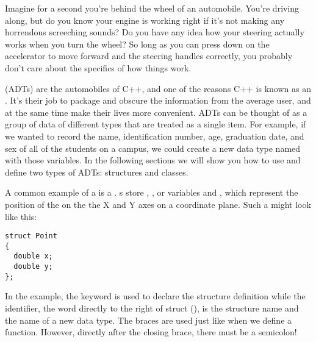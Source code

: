 

Imagine for a second you're behind the wheel of an automobile. 
You're driving along, but do you know your engine is working right if it's not making any horrendous screeching sounds? 
Do you have any idea how your steering actually works when you turn the wheel? 
So long as you can press down on the accelerator to move forward and the steering handles correctly, you probably don't care about the specifics of how things work.

 (ADTs) are the automobiles of C++, and one of the reasons C++ is known as an . 
It's their job to package and obscure the information from the average user, and at the same time make their lives more convenient.
ADTs can be thought of as a group of data of different types that are treated as a single item.
For example, if we wanted to record the name, identification number, age, graduation date, and sex of all of the students on a campus, we could create a new data type named  with those variables.
In the following sections we will show you how to use and define two types of ADTs: structures and classes. 



A common example of a  is a . s store , , or  variables  and , which represent the position of the  on the the X and Y axes on a coordinate plane. 
Such a  might look like this: \nopagebreak[4]

\noindent\begin{minipage}{\linewidth}\begin{lstlisting}
struct Point
{
  double x;
  double y;
};
\end{lstlisting}\end{minipage}

In the example, the keyword  is used to declare the structure definition while the identifier, the word directly to the right of struct (), is the structure name and the name of a new data type.
The braces are used just like when we define a function.
However, directly after the closing brace, there must be a semicolon!

